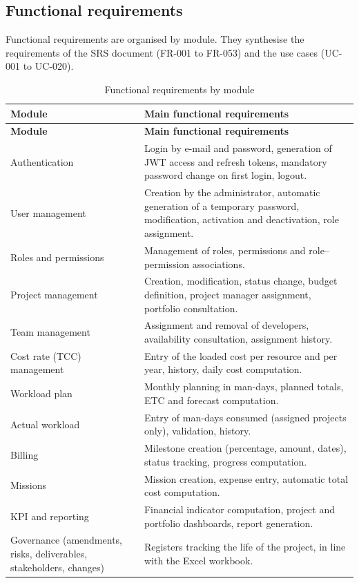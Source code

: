 \subsection{Functional requirements}
Functional requirements are organised by module. They synthesise the requirements of the SRS
document (FR-001 to FR-053) and the use cases (UC-001 to UC-020).

\begin{longtable}{|m{3.5cm}|m{11cm}|}
\caption{Functional requirements by module}\label{tab:besoins-fonctionnels}\\
\hline
\textbf{Module} & \textbf{Main functional requirements} \\
\hline
\endfirsthead
\hline
\textbf{Module} & \textbf{Main functional requirements} \\
\hline
\endhead
\endfoot
\endlastfoot
\hline
Authentication & Login by e-mail and password, generation of JWT access and refresh tokens,
mandatory password change on first login, logout. \\
\hline
User management & Creation by the administrator, automatic generation of a temporary password,
modification, activation and deactivation, role assignment. \\
\hline
Roles and permissions & Management of roles, permissions and role--permission associations. \\
\hline
Project management & Creation, modification, status change, budget definition, project manager
assignment, portfolio consultation. \\
\hline
Team management & Assignment and removal of developers, availability consultation, assignment
history. \\
\hline
Cost rate (TCC) management & Entry of the loaded cost per resource and per year, history, daily
cost computation. \\
\hline
Workload plan & Monthly planning in man-days, planned totals, ETC and forecast computation. \\
\hline
Actual workload & Entry of man-days consumed (assigned projects only), validation, history. \\
\hline
Billing & Milestone creation (percentage, amount, dates), status tracking, progress computation. \\
\hline
Missions & Mission creation, expense entry, automatic total cost computation. \\
\hline
KPI and reporting & Financial indicator computation, project and portfolio dashboards, report
generation. \\
\hline
Governance (amendments, risks, deliverables, stakeholders, changes) & Registers tracking the life
of the project, in line with the Excel workbook. \\
\hline
\end{longtable}

